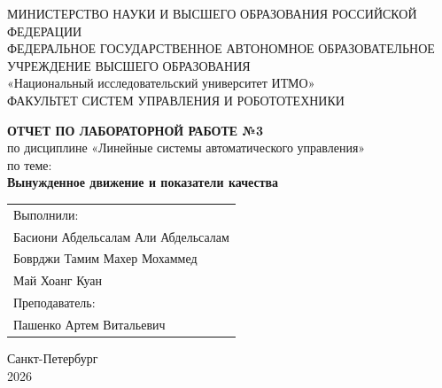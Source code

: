 \documentclass[14pt,a4paper]{extarticle}
\begin{document}
\begin{titlepage}
\begin{center}
\small
МИНИСТЕРСТВО НАУКИ И ВЫСШЕГО ОБРАЗОВАНИЯ РОССИЙСКОЙ\\
ФЕДЕРАЦИИ\\[0.3em]
ФЕДЕРАЛЬНОЕ ГОСУДАРСТВЕННОЕ АВТОНОМНОЕ ОБРАЗОВАТЕЛЬНОЕ\\
УЧРЕЖДЕНИЕ ВЫСШЕГО ОБРАЗОВАНИЯ\\[0.3em]
«Национальный исследовательский университет ИТМО»\\[0.8em]
\normalsize
ФАКУЛЬТЕТ СИСТЕМ УПРАВЛЕНИЯ И РОБОТОТЕХНИКИ

\vfill

{\bfseries ОТЧЕТ ПО ЛАБОРАТОРНОЙ РАБОТЕ №3}\\[0.5em]
по дисциплине «Линейные системы автоматического управления»\\[0.5em]
по теме:\\
{\bfseries Вынужденное движение и показатели качества}

\vfill

\begin{flushright}
\begin{tabular}{l}
Выполнили:\\
Басиони Абдельсалам Али Абдельсалам \\
Боврджи Тамим Махер Мохаммед\\
Май Хоанг Куан\\[1em]
Преподаватель:\\
Пашенко Артем Витальевич
\end{tabular}
\end{flushright}

\vfill

Санкт-Петербург\\
2026
\end{center}
\end{titlepage}

\setcounter{page}{2}

\newpage

\tableofcontents

\newpage
\renewcommand{\lstlistingname}{Листинг}
\end{document}
